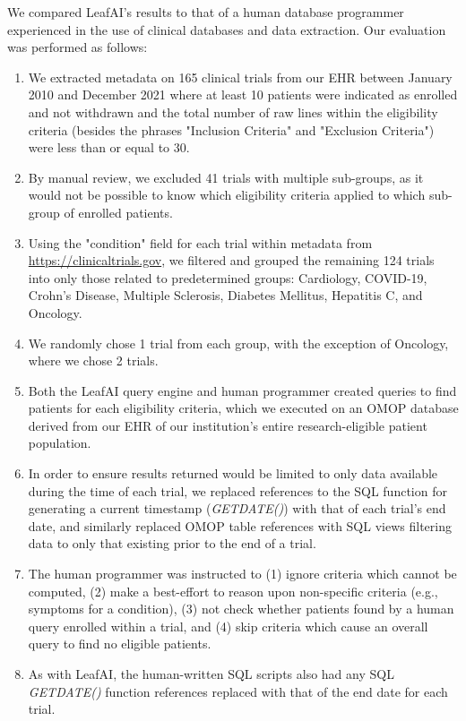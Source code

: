 \documentclass[../main.tex]{subfiles}
\begin{document}
We compared LeafAI's results to that of a human database programmer experienced in the use of clinical databases and data extraction. Our evaluation was performed as follows:

\begin{enumerate}
    \item We extracted metadata on 165 clinical trials from our EHR between January 2010 and December 2021 where at least 10 patients were indicated as enrolled and not withdrawn and the total number of raw lines within the eligibility criteria (besides the phrases "Inclusion Criteria" and "Exclusion Criteria") were less than or equal to 30.
    \item By manual review, we excluded 41 trials with multiple sub-groups, as it would not be possible to know which eligibility criteria applied to which sub-group of enrolled patients.
    \item Using the "condition" field for each trial within metadata from \url{https://clinicaltrials.gov}, we filtered and grouped the remaining 124 trials into only those related to predetermined groups: Cardiology, COVID-19, Crohn's Disease, Multiple Sclerosis, Diabetes Mellitus, Hepatitis C, and Oncology. 
    \item We randomly chose 1 trial from each group, with the exception of Oncology, where we chose 2 trials.
    \item Both the LeafAI query engine and human programmer created queries to find patients for each eligibility criteria, which we executed on an OMOP database derived from our EHR of our institution's entire research-eligible patient population. 
    \item In order to ensure results returned would be limited to only data available during the time of each trial, we replaced references to the SQL function for generating a current timestamp (\textit{GETDATE()}) with that of each trial's end date, and similarly replaced OMOP table references with SQL views filtering data to only that existing prior to the end of a trial.
    \item The human programmer was instructed to (1) ignore criteria which cannot be computed, (2) make a best-effort to reason upon non-specific criteria (e.g., symptoms for a condition), (3) not check whether patients found by a human query enrolled within a trial, and (4) skip criteria which cause an overall query to find no eligible patients. 
    \item As with LeafAI, the human-written SQL scripts also had any SQL \textit{GETDATE()} function references replaced with that of the end date for each trial.
\end{enumerate}
\end{document}
